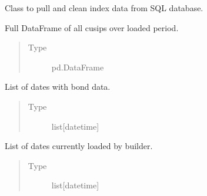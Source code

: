 \documentclass[letterpaper,10pt,english]{report}
\begin{document}
\begin{fulllineitems}
\label{\detokenize{index:lgimapy.index.IndexBuilder}}
Class to pull and clean index data from SQL database.

\begin{fulllineitems}
\label{\detokenize{index:lgimapy.index.IndexBuilder.df}}
Full DataFrame of all cusips over loaded period.
\begin{quote}\begin{description}
\item[{Type}] \leavevmode
pd.DataFrame

\end{description}\end{quote}

\end{fulllineitems}


\begin{fulllineitems}
\label{\detokenize{index:lgimapy.index.IndexBuilder.trade_dates}}
List of dates with bond data.
\begin{quote}\begin{description}
\item[{Type}] \leavevmode
list{[}datetime{]}

\end{description}\end{quote}

\end{fulllineitems}


\begin{fulllineitems}
\label{\detokenize{index:lgimapy.index.IndexBuilder.loaded_dates}}
List of dates currently loaded by builder.
\begin{quote}\begin{description}
\item[{Type}] \leavevmode
list{[}datetime{]}


\end{description}
\end{quote}
\end{fulllineitems}
\end{fulllineitems}
\end{document}
